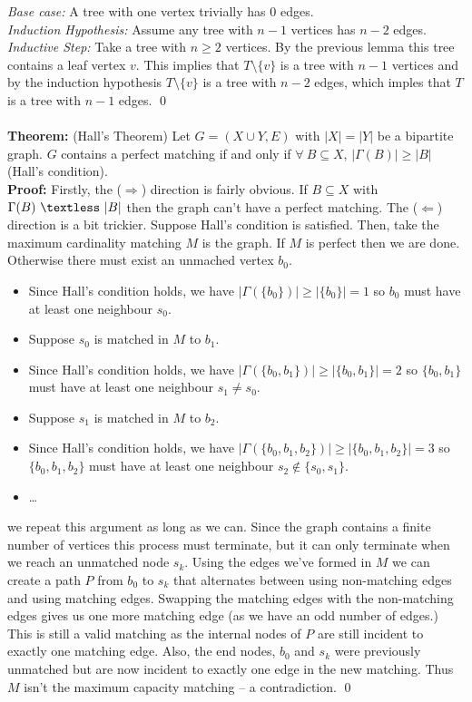 \documentclass{article}
\newcommand{\ti}[1]{\textit{#1}}
\newcommand{\lt}{\textless}
\newcommand{\imply}{\Rightarrow}
\newcommand{\Ga}{\Gamma}
\newcommand{\thm}{\textbf{Theorem: }}
\newcommand{\proo}{\textbf{Proof: }}
\begin{document}
\ti{Base case:} A tree with one vertex trivially has 0 edges.\\
\ti{Induction Hypothesis:} Assume any tree with $n-1$ vertices has $n-2$ edges.\\
\ti{Inductive Step:} Take a tree with $n \geq 2$ vertices. By the previous lemma this tree contains a leaf vertex $v$. This implies that $T\setminus\{v\}$ is a tree with $n-1$ vertices and by the induction hypothesis $T \setminus \{v\}$ is a tree with $n-2$ edges, which imples that $T$ is a tree with $n-1$ edges.
\qed\\\\
\thm (Hall's Theorem) Let $G = (X \cup Y, E)$ with $|X| = |Y|$ be a bipartite graph. $G$ contains a perfect matching if and only if $\forall\ B \subseteq X$, $|\Ga(B)| \geq |B|$ (Hall's condition).\\
\proo Firstly, the ($\imply$) direction is fairly obvious. If $B \subseteq X$ with $\Ga(B)\ \lt\ |B|$ then the graph can't have a perfect matching. The ($\Leftarrow$) direction is a bit trickier. Suppose Hall's condition is satisfied. Then, take the maximum cardinality matching $M$ is the graph. If $M$ is perfect then we are done. Otherwise there must exist an unmached vertex $b_0$.
\begin{itemize}
	\item Since Hall's condition holds, we have $|\Ga(\{b_0\})| \geq |\{b_{0}\}| = 1$ so $b_0$ must have at least one neighbour $s_0$.
	\item Suppose $s_0$ is matched in $M$ to $b_1$.
	\item Since Hall's condition holds, we have $|\Ga(\{b_0, b_1\})| \geq |\{b_{0}, b_1\}| = 2$ so $\{b_0, b_1\}$ must have at least one neighbour $s_1 \neq s_0$.
	\item Suppose $s_1$ is matched in $M$ to $b_2$.
	\item Since Hall's condition holds, we have $|\Ga(\{b_0, b_1, b_2\})| \geq |\{b_{0}, b_1, b_2\}| = 3$ so $\{b_0, b_1, b_2\}$ must have at least one neighbour $s_2 \notin \{s_0, s_1\}$.
	\item \dots
\end{itemize}
we repeat this argument as long as we can. Since the graph contains a finite number of vertices this process must terminate, but it can only terminate when we reach an unmatched node $s_k$. Using the edges we've formed in $M$ we can create a path $P$ from $b_0$ to $s_k$ that alternates between using non-matching edges and using matching edges. Swapping the matching edges with the non-matching edges gives us one more matching edge (as we have an odd number of edges.) This is still a valid matching as the internal nodes of $P$ are still incident to exactly one matching edge. Also, the end nodes, $b_0$ and $s_k$ were previously unmatched but are now incident to exactly one edge in the new matching. Thus $M$ isn't the maximum capacity matching -- a contradiction.
\qed
\end{document}
